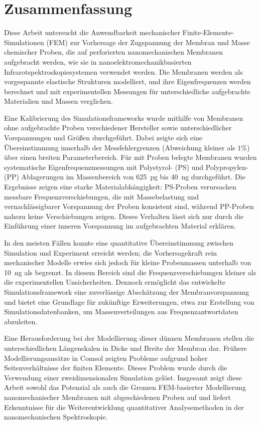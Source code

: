 \newpage
\mbox{}
\thispagestyle{empty}

\chapter*{Zusammenfassung}
Diese Arbeit untersucht die Anwendbarkeit mechanischer Finite-Elemente-Simulationen (\acf{FEM}) zur Vorhersage der Zugspannung der Membran und Masse chemischer Proben, die auf perforierten nanomechanischen Membranen aufgebracht werden, wie sie in nanoelektromechanikbasierten Infrarotspektroskopiesystemen verwendet werden. Die Membranen werden als vorgespannte elastische Strukturen modelliert, und ihre Eigenfrequenzen werden berechnet und mit experimentellen Messungen für unterschiedliche aufgebrachte Materialien und Massen verglichen.

Eine Kalibrierung des Simulationsframeworks wurde mithilfe von Membranen ohne aufgebrachte Proben verschiedener Hersteller sowie unterschiedlicher Vorspannungen und Größen durchgeführt. Dabei zeigte sich eine Übereinstimmung innerhalb der Messfehlergrenzen (Abweichung kleiner als $1\%$) über einen breiten Parameterbereich. Für mit Proben belegte Membranen wurden systematische Eigenfrequenzmessungen mit Polystyrol- (PS) und Polypropylen- (PP) Ablagerungen im Massenbereich von \SI{625}{\pico\gram} bis \SI{40}{\nano\gram} durchgeführt. Die Ergebnisse zeigen eine starke Materialabhängigkeit: PS-Proben verursachen messbare Frequenzverschiebungen, die mit Massebelastung und vernachlässigbarer Vorspannung der Proben konsistent sind, während PP-Proben nahezu keine Verschiebungen zeigen. Dieses Verhalten lässt sich nur durch die Einführung einer inneren Vorspannung im aufgebrachten Material erklären.

In den meisten Fällen konnte eine quantitative Übereinstimmung zwischen Simulation und Experiment erreicht werden; die Vorhersagekraft rein mechanischer Modelle erwies sich jedoch für kleine Probenmassen unterhalb von \SI{10}{\nano\gram} als begrenzt. In diesem Bereich sind die Frequenzverschiebungen kleiner als die experimentellen Unsicherheiten. Dennoch ermöglicht das entwickelte Simulationsframework eine zuverlässige Abschätzung der Membranvorspannung und bietet eine Grundlage für zukünftige Erweiterungen, etwa zur Erstellung von Simulationsdatenbanken, um Massenverteilungen aus Frequenzantwortdaten abzuleiten.

Eine Herausforderung bei der Modellierung dieser dünnen Membranen stellen die unterschiedlichen Längenskalen in Dicke und Breite der Membran dar. Frühere Modellierungsansätze in Comsol zeigten Probleme aufgrund hoher Seitenverhältnisse der finiten Elemente. Dieses Problem wurde durch die Verwendung einer zweidimensionalen Simulation gelöst. Insgesamt zeigt diese Arbeit sowohl das Potenzial als auch die Grenzen \acf{FEM}-basierter Modellierung nanomechanischer Membranen mit abgeschiedenen Proben auf und liefert Erkenntnisse für die Weiterentwicklung quantitativer Analysemethoden in der nanomechanischen Spektroskopie. 



